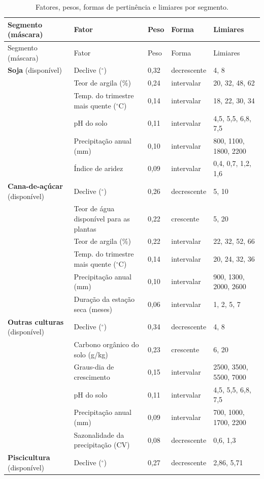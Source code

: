 \begin{longtable}{@{}p{2.6cm}p{3.6cm}p{1cm}p{1.7cm}p{3.3cm}@{}}
\caption{Fatores, pesos, formas de pertinência e limiares por segmento.}\label{tab:spec-longtable} \\
\toprule
Segmento (máscara) & Fator & Peso & Forma & Limiares \\
\midrule
\endfirsthead
\toprule
Segmento (máscara) & Fator & Peso & Forma & Limiares \\
\midrule
\endhead
\textbf{Soja} (disponível) & Declive ($^\circ$) & 0,32 & decrescente & 4, 8 \\
 & Teor de argila (\%) & 0,24 & intervalar & 20, 32, 48, 62 \\
 & Temp. do trimestre mais quente ($^\circ$C) & 0,14 & intervalar & 18, 22, 30, 34 \\
 & pH do solo & 0,11 & intervalar & 4,5, 5,5, 6,8, 7,5 \\
 & Precipitação anual (mm) & 0,10 & intervalar & 800, 1100, 1800, 2200 \\
 & Índice de aridez & 0,09 & intervalar & 0,4, 0,7, 1,2, 1,6 \\
\textbf{Cana-de-açúcar} (disponível) & Declive ($^\circ$) & 0,26 & decrescente & 5, 10 \\
 & Teor de água disponível para as plantas & 0,22 & crescente & 5, 20 \\
 & Teor de argila (\%) & 0,22 & intervalar & 22, 32, 52, 66 \\
 & Temp. do trimestre mais quente ($^\circ$C) & 0,14 & intervalar & 20, 24, 32, 36 \\
 & Precipitação anual (mm) & 0,10 & intervalar & 900, 1300, 2000, 2600 \\
 & Duração da estação seca (meses) & 0,06 & intervalar & 1, 2, 5, 7 \\
\textbf{Outras culturas} (disponível) & Declive ($^\circ$) & 0,34 & decrescente & 4, 8 \\
 & Carbono orgânico do solo (g/kg) & 0,23 & crescente & 6, 20 \\
 & Graus-dia de crescimento & 0,15 & intervalar & 2500, 3500, 5500, 7000 \\
 & pH do solo & 0,11 & intervalar & 4,5, 5,5, 6,8, 7,5 \\
 & Precipitação anual (mm) & 0,09 & intervalar & 700, 1000, 1700, 2200 \\
 & Sazonalidade da precipitação (CV) & 0,08 & decrescente & 0,6, 1,3 \\
\textbf{Piscicultura} (disponível) & Declive ($^\circ$) & 0,27 & decrescente & 2,86, 5,71 \\

\end{longtable}
